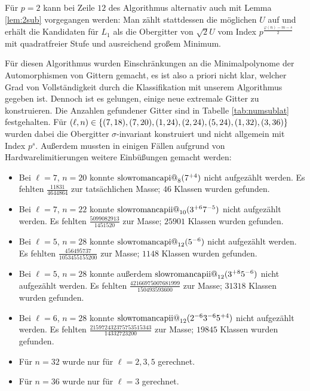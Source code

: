 \documentclass[12pt,a4paper,halfparskip,headsepline,bibtotocnumbered]{scrreprt}
\makeatletter
\theoremstyle{nummermitklammern}
\theoremstyle{nonumberbreak}
\renewcommand{\i}{\text{\expandafter\@slowromancap\romannumeral 1@}}
\newcommand{\ii}{\text{\expandafter\@slowromancap\romannumeral 2@}}
\makeatother
\begin{document}
Für $p = 2$ kann bei Zeile $12$ des Algorithmus alternativ auch mit Lemma \eqref{lem:2sub} vorgegangen werden: Man zählt stattdessen die möglichen $U$ auf und erhält die Kandidaten für $L_1$ als die Obergitter von $\sqrt{2} U$ vom Index $p^\frac{\varphi(n)-m - s}{2}$ mit quadratfreier Stufe und ausreichend großem Minimum.\par
Für diesen Algorithmus wurden Einschränkungen an die Minimalpolynome der Automorphismen von Gittern gemacht, es ist also a priori nicht klar, welcher Grad von Vollständigkeit durch die Klassifikation mit unserem Algorithmus gegeben ist. Dennoch ist es gelungen, einige neue extremale Gitter zu konstruieren. Die Anzahlen gefundener Gitter sind in Tabelle \eqref{tab:numsublat} festgehalten. Für $(\ell, n) \in \lbrace (7,18), (7,20), (1,24), (2,24), (5,24),\linebreak
 (1,32), (3,36) \rbrace$ wurden dabei die Obergitter $\sigma$-invariant konstruiert und nicht allgemein mit Index $p^s$. Außerdem mussten in einigen Fällen aufgrund von Hardwarelimitierungen weitere Einbüßungen gemacht werden:
\begin{itemize}
	\item Bei $\ell = 7$, $n = 20$ konnte $\i_8(7^{+4})$ nicht aufgezählt werden. Es fehlten $\frac{11831}{4644864}$ zur tatsächlichen Masse; $46$ Klassen wurden gefunden.
	\item Bei $\ell = 7$, $n = 22$ konnte $\ii_{10}(3^{+6}7^{-5})$ nicht aufgezählt werden. Es fehlten $\frac{5099082913}{1451520}$ zur Masse; $25901$ Klassen wurden gefunden.
	\item Bei $\ell = 5$, $n = 28$ konnte $\i_{12}(5^{-6})$ nicht aufgezählt werden. Es fehlten $\frac{456495737}{1053455155200}$ zur Masse; $1148$ Klassen wurden gefunden.
	\item Bei $\ell = 5$, $n=28$ konnte außerdem $\ii_{12}(3^{+8}5^{-6})$ nicht aufgezählt werden. Es fehlten $\frac{42166975007681999}{150493593600}$ zur Masse; $31318$ Klassen wurden gefunden.
	\item Bei $\ell = 6$, $n = 28$ konnte $\ii_{12}(2^{-6}3^{-6}5^{+4})$ nicht aufgezählt werden. Es fehlten $\frac{215972432375753515343}{14332723200}$ zur Masse; $19845$ Klassen wurden gefunden.
	\item Für $n = 32$ wurde nur für $\ell = 2,3,5$ gerechnet.
	\item Für $n = 36$ wurde nur für $\ell = 3$ gerechnet.
\end{itemize}
\end{document}
